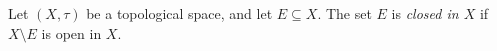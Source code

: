 \begin{definition}\label{def:topological-closed-set}
Let \((X,\tau)\) be a topological space, and let \(E\subseteq X\).  The set
\(E\) is \emph{closed in \(X\)} if \(X\setminus E\) is open in \(X\).
\end{definition}